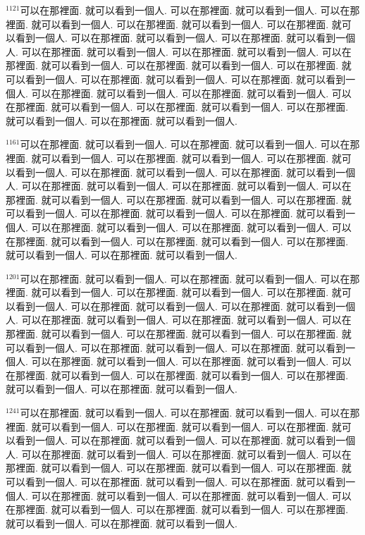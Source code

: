\documentclass{book}
\begin{document}
$^{1121}$可以在那裡面.
就可以看到一個人.
可以在那裡面.
就可以看到一個人.
可以在那裡面.
就可以看到一個人.
可以在那裡面.
就可以看到一個人.
可以在那裡面.
就可以看到一個人.
可以在那裡面.
就可以看到一個人.
可以在那裡面.
就可以看到一個人.
可以在那裡面.
就可以看到一個人.
可以在那裡面.
就可以看到一個人.
可以在那裡面.
就可以看到一個人.
可以在那裡面.
就可以看到一個人.
可以在那裡面.
就可以看到一個人.
可以在那裡面.
就可以看到一個人.
可以在那裡面.
就可以看到一個人.
可以在那裡面.
就可以看到一個人.
可以在那裡面.
就可以看到一個人.
可以在那裡面.
就可以看到一個人.
可以在那裡面.
就可以看到一個人.
可以在那裡面.
就可以看到一個人.
可以在那裡面.
就可以看到一個人.

$^{1161}$可以在那裡面.
就可以看到一個人.
可以在那裡面.
就可以看到一個人.
可以在那裡面.
就可以看到一個人.
可以在那裡面.
就可以看到一個人.
可以在那裡面.
就可以看到一個人.
可以在那裡面.
就可以看到一個人.
可以在那裡面.
就可以看到一個人.
可以在那裡面.
就可以看到一個人.
可以在那裡面.
就可以看到一個人.
可以在那裡面.
就可以看到一個人.
可以在那裡面.
就可以看到一個人.
可以在那裡面.
就可以看到一個人.
可以在那裡面.
就可以看到一個人.
可以在那裡面.
就可以看到一個人.
可以在那裡面.
就可以看到一個人.
可以在那裡面.
就可以看到一個人.
可以在那裡面.
就可以看到一個人.
可以在那裡面.
就可以看到一個人.
可以在那裡面.
就可以看到一個人.
可以在那裡面.
就可以看到一個人.

$^{1201}$可以在那裡面.
就可以看到一個人.
可以在那裡面.
就可以看到一個人.
可以在那裡面.
就可以看到一個人.
可以在那裡面.
就可以看到一個人.
可以在那裡面.
就可以看到一個人.
可以在那裡面.
就可以看到一個人.
可以在那裡面.
就可以看到一個人.
可以在那裡面.
就可以看到一個人.
可以在那裡面.
就可以看到一個人.
可以在那裡面.
就可以看到一個人.
可以在那裡面.
就可以看到一個人.
可以在那裡面.
就可以看到一個人.
可以在那裡面.
就可以看到一個人.
可以在那裡面.
就可以看到一個人.
可以在那裡面.
就可以看到一個人.
可以在那裡面.
就可以看到一個人.
可以在那裡面.
就可以看到一個人.
可以在那裡面.
就可以看到一個人.
可以在那裡面.
就可以看到一個人.
可以在那裡面.
就可以看到一個人.

$^{1241}$可以在那裡面.
就可以看到一個人.
可以在那裡面.
就可以看到一個人.
可以在那裡面.
就可以看到一個人.
可以在那裡面.
就可以看到一個人.
可以在那裡面.
就可以看到一個人.
可以在那裡面.
就可以看到一個人.
可以在那裡面.
就可以看到一個人.
可以在那裡面.
就可以看到一個人.
可以在那裡面.
就可以看到一個人.
可以在那裡面.
就可以看到一個人.
可以在那裡面.
就可以看到一個人.
可以在那裡面.
就可以看到一個人.
可以在那裡面.
就可以看到一個人.
可以在那裡面.
就可以看到一個人.
可以在那裡面.
就可以看到一個人.
可以在那裡面.
就可以看到一個人.
可以在那裡面.
就可以看到一個人.
可以在那裡面.
就可以看到一個人.
可以在那裡面.
就可以看到一個人.
可以在那裡面.
就可以看到一個人.
\end{document}
